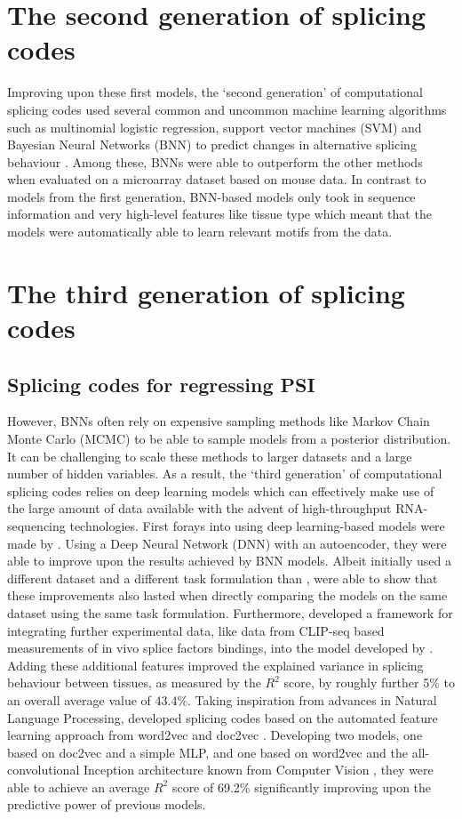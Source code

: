 \section{The second generation of splicing codes}
Improving upon these first models, the `second generation' of computational splicing codes used several common and uncommon machine learning algorithms such as multinomial logistic regression, support vector machines (SVM) and Bayesian Neural Networks (BNN) to predict changes in alternative splicing behaviour \cite{bnnsplicing}. Among these, BNNs were able to outperform the other methods when evaluated on a microarray dataset based on mouse data. In contrast to models from the first generation, BNN-based models only took in sequence information and very high-level features like tissue type which meant that the models were automatically able to learn relevant motifs from the data.

\section{The third generation of splicing codes}
\subsection{Splicing codes for regressing PSI}
However, BNNs often rely on expensive sampling methods like Markov Chain Monte Carlo (MCMC) to be able to sample models from a posterior distribution. It can be challenging to scale these methods to larger datasets and a large number of hidden variables.
As a result, the `third generation' of computational splicing codes relies on deep learning models which can effectively make use of the large amount of data available with the advent of high-throughput RNA-sequencing technologies. First forays into using deep learning-based models were made by \cite{leung2014}. Using a Deep Neural Network (DNN) with an autoencoder, they were able to improve upon the results achieved by BNN models. Albeit \cite{leung2014} initially used a different dataset and a different task formulation than \cite{bnnsplicing}, \cite{jha} were able to show that these improvements also lasted when directly comparing the models on the same dataset using the same task formulation. Furthermore, \cite{jha} developed a framework for integrating further experimental data, like data from CLIP-seq based measurements of in vivo splice factors bindings, into the model developed by \cite{leung2014}. Adding these additional features improved the explained variance in splicing behaviour between tissues, as measured by the $R^2$ score, by roughly further 5\% to an overall average value of 43.4\%.
Taking inspiration from advances in Natural Language Processing, \cite{d2vsplicing} developed splicing codes based on the automated feature learning approach from word2vec \cite{w2v1} \cite{w2v2} and doc2vec \cite{d2v1} \cite{d2v2}. Developing two models, one based on doc2vec and a simple MLP, and one based on word2vec and the all-convolutional Inception architecture known from Computer Vision \cite{inception}, they were able to achieve an average $R^2$ score of 69.2\% significantly improving upon the predictive power of previous models.

